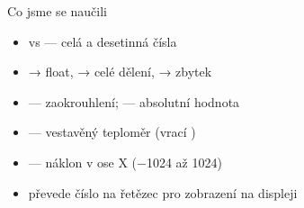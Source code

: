 \begin{frame}{Co jsme se naučili}
  \begin{itemize}
    \item[\checkmark]  vs  — celá a desetinná čísla
    \item[\checkmark] \pyinline{/} → float, \pyinline{//} → celé dělení, \pyinline{\%} → zbytek
    \item[\checkmark]  — zaokrouhlení;  — absolutní hodnota
    \item[\checkmark]  — vestavěný teploměr (vrací )
    \item[\checkmark]  — náklon v ose X (−1024 až 1024)
    \item[\checkmark]  převede číslo na řetězec pro zobrazení na displeji
  \end{itemize}
\end{frame}


